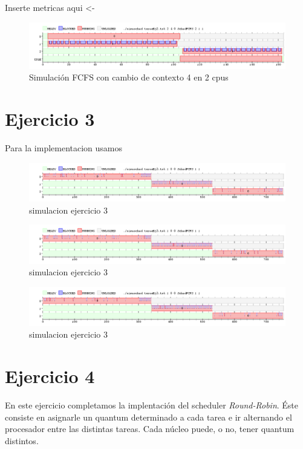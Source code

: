 \documentclass[11pt]{article}
\begin{document}
  Inserte metricas aqui <-

  \begin{figure}[H]
    \includegraphics[scale=0.5]{Ejercicio2_2cpu}
    \caption{Simulación FCFS con cambio de contexto 4 en 2 cpus}
  \end{figure}

\section{Ejercicio 3}
  Para la implementacion usamos
  \begin{figure}[H]
    \includegraphics[scale=0.5]{Ejercicio3_1}
    \caption{simulacion ejercicio 3}
  \end{figure}

  \begin{figure}[H]
    \includegraphics[scale=0.5]{Ejercicio3_2}
    \caption{simulacion ejercicio 3}
  \end{figure}

  \begin{figure}[H]
    \includegraphics[scale=0.5]{Ejercicio3_3}
    \caption{simulacion ejercicio 3}
  \end{figure}
\newpage

\section{Ejercicio 4}

En este ejercicio completamos la implentación del scheduler \textit{Round-Robin}. Éste consiste en asignarle un quantum determinado a cada tarea e ir alternando el procesador entre las distintas tareas. Cada núcleo puede, o no, tener quantum distintos. 
\end{document}
